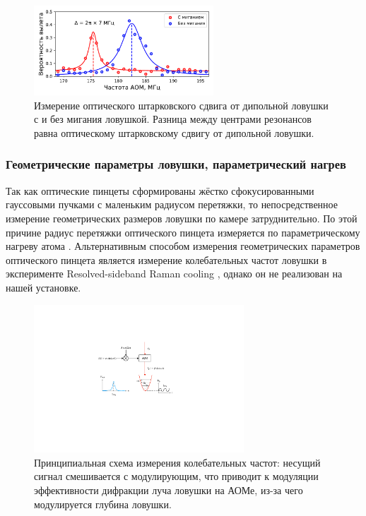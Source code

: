 \begin{figure}[H]
	\centering
	\includegraphics[width=0.6\textwidth]{images/trap_depth.pdf}
	\caption{Измерение оптического штарковского сдвига от дипольной ловушки с и без мигания ловушкой. Разница между центрами резонансов равна оптическому штарковскому сдвигу от дипольной ловушки.}
	\label{fig:trap_depth}
\end{figure}

\subsubsection{Геометрические параметры ловушки, параметрический нагрев}
\label{sec:trap_geom}

Так как оптические пинцеты сформированы жёстко сфокусированными гауссовыми пучками с маленьким радиусом перетяжки, то непосредственное измерение геометрических размеров ловушки по камере затруднительно. По этой причине радиус перетяжки оптического пинцета измеряется по параметрическому нагреву атома \cite{Param_Heating_Friebel,Param_Heating_Savard,Param_Heating_Gardiner,J_uregui_2001}. Альтернативным способом измерения геометрических параметров оптического пинцета является измерение колебательных частот ловушки в эксперименте Resolved-sideband Raman cooling \cite{Kaufman_2012,Thompson_2013}, однако он не реализован на нашей установке. 

\begin{figure}[H]
	\centering
	\includegraphics[width=0.7\textwidth]{images/parametric_heating.pdf}
	\caption{Принципиальная схема измерения колебательных частот: несущий сигнал смешивается с модулирующим, что приводит к модуляции эффективности дифракции луча ловушки на АОМе, из-за чего модулируется глубина ловушки.}
	\label{fig:parametric_heating}
\end{figure}

